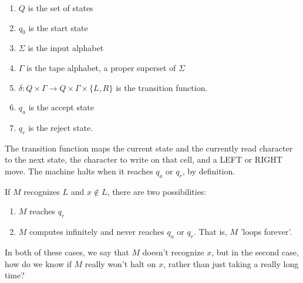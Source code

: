 \documentclass[twoside]{article}
\begin{document}

\begin{enumerate}
	\item[] $Q$ is the set of states
	\item[] $q_0$ is the start state
	\item[] $\Sigma$ is the input alphabet
	\item[] $\Gamma$ is the tape alphabet, a proper superset of $\Sigma$
	\item[] $\delta: Q\times\Gamma\rightarrow Q\times\Gamma\times\{L,R\}$ is the transition function.
	\item[] $q_a$ is the accept state
	\item[] $q_r$ is the reject state.
	
\end{enumerate}

The transition function maps the current state and the currently read character to the next state, the character to write on that cell, and a LEFT or RIGHT move.  The machine halts when it reaches $q_a$ or $q_r$, by definition.


If $M$ recognizes $L$ and $x\notin L$, there are two possibilities:

\begin{enumerate}
	\item $M$ reaches $q_r$
	\item $M$ computes infinitely and never reaches $q_a$ or $q_r$.  That is, $M$ 'loops forever'.
\end{enumerate}

In both of these cases, we say that $M$ doesn't recognize $x$, but in the second case, how do we know if $M$ really won't halt on $x$, rather than just taking a really long time?



\end{document}
